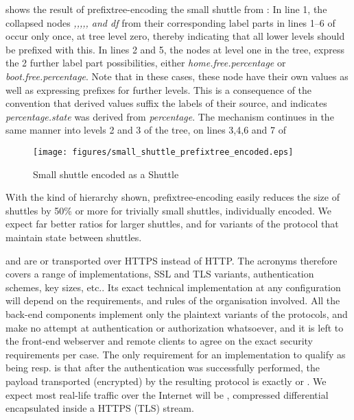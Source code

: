  shows the result of prefixtree-encoding
the small shuttle from : In line 1, the
collapsed nodes \emph{\clientc,\clientcn,\clientou,\clientrealm,\clientsys, and df} from their
corresponding label parts in lines 1--6 of 
occur only once, at tree level zero, thereby indicating that all lower
levels should be prefixed with this. In lines 2 and 5, the nodes at level
one in the tree, express the 2 further label part possibilities, either
\emph{home.free.percentage} or \emph{boot.free.percentage}.  Note that
in these cases, these node have their own values as well as expressing
prefixes for further levels. This is a consequence of the \rawproto{}
convention that derived values suffix the labels of their source, and
indicates \emph{percentage.state} was derived from \emph{percentage}. The
mechanism continues in the same manner into levels 2 and 3 of the tree,
on lines 3,4,6 and 7 of 

\begin{figure}[ht]
	\centering
    \texttt{[image: figures/small\_shuttle\_prefixtree\_encoded.eps]}
    \caption{Small \rawordiffproto{} shuttle
    encoded as a \compproto{} Shuttle} \label{fig:smallshuttleencoded}
\end{figure}

With the kind of hierarchy shown, prefixtree-encoding easily reduces
the size of shuttles by 50\% or more for trivially small shuttles,
individually encoded. We expect far better ratios for larger shuttles,
and for variants of the protocol that maintain state between shuttles.

\secproto{} and \seccompproto{} are \diffproto{} or \compproto{}
transported over HTTPS instead of HTTP.  The acronyms therefore covers
a range of implementations, SSL and TLS variants, authentication
schemes, key sizes, etc..  Its exact technical implementation at
any configuration will depend on the requirements, and rules of the
organisation involved. All the back-end components implement only the
plaintext variants of the protocols, and make no attempt at authentication
or authorization whatsoever, and it is left to the front-end webserver
and remote clients to agree on the exact security requirements per case.
The only requirement for an implementation to qualify as being \secproto{}
resp. \seccompproto{} is that after the authentication was successfully
performed, the payload transported (encrypted) by the resulting
protocol is exactly \diffproto{} or \compproto{}. We expect most real-life
traffic over the Internet will be \seccompproto{}, compressed differential
\rawproto{} encapsulated inside a HTTPS (TLS) stream.

